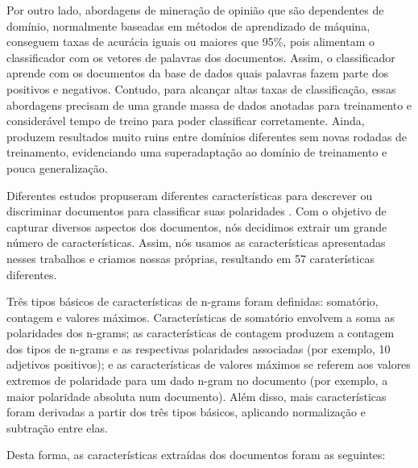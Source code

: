Por outro lado, abordagens de mineração de opinião que são dependentes de domínio, normalmente baseadas em métodos de aprendizado de máquina, conseguem taxas de acurácia iguais ou maiores que 95\%, pois alimentam o classificador com os vetores de palavras dos documentos. Assim, o classificador aprende com os documentos da base de dados quais palavras fazem parte dos positivos e negativos. Contudo, para alcançar altas taxas de classificação, essas abordagens precisam de uma grande massa de dados anotadas para treinamento e considerável tempo de treino para poder classificar corretamente. Ainda, produzem resultados muito ruins entre domínios diferentes sem novas rodadas de treinamento, evidenciando uma superadaptação ao domínio de treinamento e pouca generalização.

Diferentes estudos propuseram diferentes características para descrever ou discriminar documentos para classificar suas polaridades \cite{wilson2005recognizing, ohana2009sentiment, taboada2011lexicon}. Com o objetivo de capturar diversos aspectos dos documentos, nós decidimos extrair um grande número de características. Assim, nós usamos as características apresentadas nesses trabalhos e criamos nossas próprias, resultando em 57 caraterísticas diferentes.



Três tipos básicos de características de n-grams foram definidas: somatório, contagem e valores máximos. Características de somatório envolvem a soma as polaridades dos n-grams; as características de contagem produzem a contagem dos tipos de n-grams e as respectivas polaridades associadas (por exemplo, 10 adjetivos positivos); e as características de valores máximos se referem aos valores extremos de polaridade para um dado n-gram no documento (por exemplo, a maior polaridade absoluta num documento). Além disso, mais características foram derivadas a partir dos três tipos básicos, aplicando normalização e subtração entre elas. 



Desta forma, as características extraídas dos documentos foram as seguintes:

